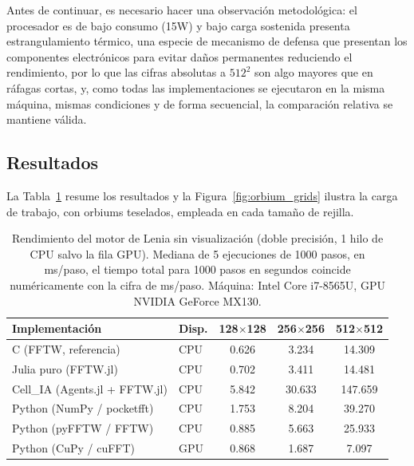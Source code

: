 \documentclass[runningheads]{llncs}
\begin{document}
Antes de continuar, es necesario hacer una observación metodológica: el procesador es de bajo consumo (15W) y bajo carga sostenida presenta estrangulamiento térmico, una especie de mecanismo de defensa que presentan los componentes electrónicos para evitar daños permanentes reduciendo el rendimiento, por lo que las cifras absolutas a $512^2$ son algo mayores que en ráfagas cortas, y, como todas las implementaciones se ejecutaron en la misma máquina, mismas condiciones y de forma secuencial, la comparación relativa se mantiene válida.

\subsection{Resultados}
\label{sec:rendimiento_resultados}

La Tabla~\ref{tab:rendimiento_lenia} resume los resultados y la Figura~\ref{fig:orbium_grids} ilustra la carga de trabajo, con orbiums teselados, empleada en cada tamaño de rejilla.

\begin{table}[H]
\centering
\caption{Rendimiento del motor de Lenia sin visualización (doble precisión, 1 hilo de CPU salvo la fila GPU). Mediana de 5 ejecuciones de 1000 pasos, en ms/paso, el tiempo total para 1000 pasos en segundos coincide numéricamente con la cifra de ms/paso. Máquina: Intel Core i7-8565U, GPU NVIDIA GeForce MX130.}
\label{tab:rendimiento_lenia}
\begin{tabular}{@{}llccc@{}}
\toprule
\textbf{Implementación} & \textbf{Disp.} & \textbf{128$\times$128} & \textbf{256$\times$256} & \textbf{512$\times$512} \\ \midrule
C (FFTW, referencia)            & CPU & 0.626 & 3.234 & 14.309 \\
Julia puro (FFTW.jl)            & CPU & 0.702 & 3.411 & 14.481 \\
Cell\_IA (Agents.jl + FFTW.jl)  & CPU & 5.842 & 30.633 & 147.659 \\
Python (NumPy / pocketfft)      & CPU & 1.753 & 8.204 & 39.270 \\
Python (pyFFTW / FFTW)          & CPU & 0.885 & 5.663 & 25.933 \\
Python (CuPy / cuFFT)           & GPU & 0.868 & 1.687 & 7.097 \\ \bottomrule
\end{tabular}
\end{table}
\end{document}
